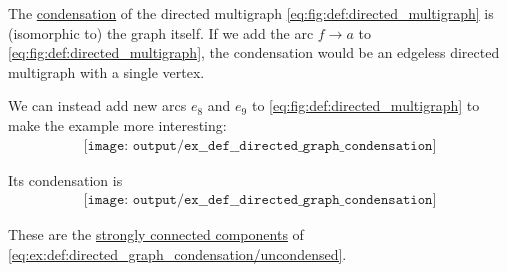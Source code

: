 \begin{example}\label{ex:def:directed_graph_condensation}
  The \hyperref[def:directed_graph_condensation]{condensation} of the directed multigraph \eqref{eq:fig:def:directed_multigraph} is (isomorphic to) the graph itself. If we add the arc \( f \to a \) to \eqref{eq:fig:def:directed_multigraph}, the condensation would be an edgeless directed multigraph with a single vertex.

  We can instead add new arcs \( e_8 \) and \( e_9 \) to \eqref{eq:fig:def:directed_multigraph} to make the example more interesting:
  \begin{equation}\label{eq:ex:def:directed_graph_condensation/uncondensed}
    \begin{aligned}
      \texttt{[image: output/ex\_\_def\_\_directed\_graph\_condensation]}
    \end{aligned}
  \end{equation}

  Its condensation is
  \begin{equation}\label{eq:ex:def:directed_graph_condensation/condensed}
    \begin{aligned}
      \texttt{[image: output/ex\_\_def\_\_directed\_graph\_condensation]}
    \end{aligned}
  \end{equation}

  These are the \hyperref[def:graph_connectedness/strong]{strongly connected components} of \eqref{eq:ex:def:directed_graph_condensation/uncondensed}.
\end{example}

